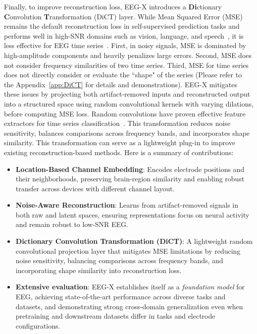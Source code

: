 \documentclass{article} %
\begin{document}

Finally, to improve reconstruction loss, EEG-X introduces a \textbf{Di}ctionary \textbf{C}onvolution \textbf{T}ransformation (DiCT) layer. While Mean Squared Error (MSE) remains the default reconstruction loss in self-supervised prediction tasks and performs well in high-SNR domains such as vision, language, and speech~\citep{data2vec2-2023,data2vec2022}, it is less effective for EEG time series~\citep{MSE,foumani2024series2vec}. First, in noisy signals, MSE is dominated by high-amplitude components and heavily penalizes large errors. Second, MSE does not consider frequency similarities of two time series. Third, MSE for time series does not directly consider or evaluate the ``shape" of the series (Please refer to the Appendix~\ref{app:DiCT} for details and demonstrations).
EEG-X mitigates these issues by projecting both artifact-removed inputs and reconstructed output into a structured space using random convolutional kernels with varying dilations, before computing MSE loss. Random convolutions have proven effective feature extractors for time series classification~\citep{Rocket,Hydra}. This transformation reduces noise sensitivity, balances comparisons across frequency bands, and incorporates shape similarity. This transformation can serve as a lightweight plug-in to improve existing reconstruction-based methods. Here is a summary of contributions:
\begin{itemize}[left=0.6em]
\item \textbf{Location-Based Channel Embedding}: Encodes electrode positions and their neighborhoods, preserving brain-region similarity and enabling robust transfer across devices with different channel layout.
\item \textbf{Noise-Aware Reconstruction}: Learns from artifact-removed signals in both raw and latent spaces, ensuring representations focus on neural activity and remain robust to low-SNR EEG.
\item \textbf{Dictionary Convolution Transformation (DiCT)}: A lightweight random convolutional projection layer that mitigates MSE limitations by reducing noise sensitivity, balancing comparisons across frequency bands, and incorporating shape similarity into reconstruction loss.
\item \textbf{Extensive evaluation}: EEG-X establishes itself as a \emph{foundation model} for EEG, achieving state-of-the-art performance across diverse tasks and datasets, and demonstrating strong cross-domain generalization even when pretraining and downstream datasets differ in tasks and electrode configurations.
\end{itemize}
\end{document}
